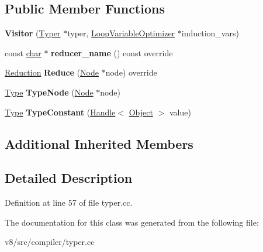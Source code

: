\subsection*{Public Member Functions}
\begin{DoxyCompactItemize}
\item 
\mbox{\label{classv8_1_1internal_1_1compiler_1_1Typer_1_1Visitor_a81a0257fba98bc1ed7d5590b3c3eca84}} 
{\bfseries Visitor} (\mbox{\hyperlink{classv8_1_1internal_1_1compiler_1_1Typer}{Typer}} $\ast$typer, \mbox{\hyperlink{classv8_1_1internal_1_1compiler_1_1LoopVariableOptimizer}{Loop\+Variable\+Optimizer}} $\ast$induction\+\_\+vars)
\item 
\mbox{\label{classv8_1_1internal_1_1compiler_1_1Typer_1_1Visitor_a6138189b93508a2548c69c57e95e2283}} 
const \mbox{\hyperlink{classchar}{char}} $\ast$ {\bfseries reducer\+\_\+name} () const override
\item 
\mbox{\label{classv8_1_1internal_1_1compiler_1_1Typer_1_1Visitor_ae79a117c7cedd45f4f4796f1abf45264}} 
\mbox{\hyperlink{classv8_1_1internal_1_1compiler_1_1Reduction}{Reduction}} {\bfseries Reduce} (\mbox{\hyperlink{classv8_1_1internal_1_1compiler_1_1Node}{Node}} $\ast$node) override
\item 
\mbox{\label{classv8_1_1internal_1_1compiler_1_1Typer_1_1Visitor_a13fa241a5faeb22c59aebcdfc8c71ef1}} 
\mbox{\hyperlink{classv8_1_1internal_1_1compiler_1_1Type}{Type}} {\bfseries Type\+Node} (\mbox{\hyperlink{classv8_1_1internal_1_1compiler_1_1Node}{Node}} $\ast$node)
\item 
\mbox{\label{classv8_1_1internal_1_1compiler_1_1Typer_1_1Visitor_af4768251b9742fe41ac7de12aad76334}} 
\mbox{\hyperlink{classv8_1_1internal_1_1compiler_1_1Type}{Type}} {\bfseries Type\+Constant} (\mbox{\hyperlink{classv8_1_1internal_1_1Handle}{Handle}}$<$ \mbox{\hyperlink{classv8_1_1internal_1_1Object}{Object}} $>$ value)
\end{DoxyCompactItemize}
\subsection*{Additional Inherited Members}


\subsection{Detailed Description}


Definition at line 57 of file typer.\+cc.



The documentation for this class was generated from the following file\+:\begin{DoxyCompactItemize}
\item 
v8/src/compiler/typer.\+cc\end{DoxyCompactItemize}
